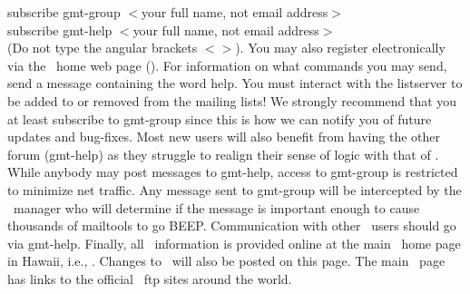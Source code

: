 \vspace{\baselineskip} 

subscribe gmt-group $<$your full name, not email address$>$ \\

subscribe gmt-help $<$your full name, not email address$>$ \\

(Do not type the angular brackets $<$$>$).  You may also
register electronically via the \GMT\ home web
page (\GMTSITE).  For information
on what commands you may send, send a message containing
the word help.  You must interact with the listserver to be
added to or removed from the mailing lists!  We strongly recommend that you
at least subscribe to gmt-group since this is how we can notify
you of future updates and bug-fixes.  Most new users will
also benefit from having the other forum (gmt-help) as they
struggle to realign their sense of logic with that of \GMT.
While anybody may post messages to gmt-help, access to gmt-group
is restricted to minimize net traffic.  Any message sent to
gmt-group will be intercepted by the \GMT\ manager who will
determine if the message is important enough to cause thousands
of mailtools to go BEEP.  Communication with other \GMT\ users
should go via gmt-help.  Finally, all \GMT\ information is provided
online at the main \GMT\ home page in Hawaii, i.e.,
\GMTSITE.  Changes to \GMT\ will also be posted
on this page.  The main \GMT\ page has links to the official
\GMT\ ftp sites around the world.
